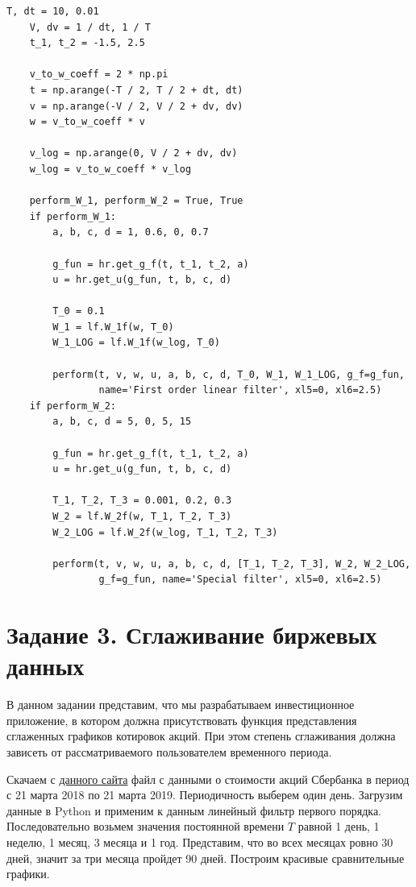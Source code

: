 \documentclass[a4paper, 12pt]{article}
\begin{document}
\begin{lstlisting}[label=l2, caption={Алгоритм, использующий приведенные ранее программы}]
    T, dt = 10, 0.01
    V, dv = 1 / dt, 1 / T
    t_1, t_2 = -1.5, 2.5

    v_to_w_coeff = 2 * np.pi
    t = np.arange(-T / 2, T / 2 + dt, dt)
    v = np.arange(-V / 2, V / 2 + dv, dv)
    w = v_to_w_coeff * v
    
    v_log = np.arange(0, V / 2 + dv, dv)
    w_log = v_to_w_coeff * v_log

    perform_W_1, perform_W_2 = True, True
    if perform_W_1:
        a, b, c, d = 1, 0.6, 0, 0.7

        g_fun = hr.get_g_f(t, t_1, t_2, a)
        u = hr.get_u(g_fun, t, b, c, d)

        T_0 = 0.1
        W_1 = lf.W_1f(w, T_0)
        W_1_LOG = lf.W_1f(w_log, T_0)

        perform(t, v, w, u, a, b, c, d, T_0, W_1, W_1_LOG, g_f=g_fun, 
                name='First order linear filter', xl5=0, xl6=2.5)
    if perform_W_2:
        a, b, c, d = 5, 0, 5, 15

        g_fun = hr.get_g_f(t, t_1, t_2, a)
        u = hr.get_u(g_fun, t, b, c, d)

        T_1, T_2, T_3 = 0.001, 0.2, 0.3
        W_2 = lf.W_2f(w, T_1, T_2, T_3)
        W_2_LOG = lf.W_2f(w_log, T_1, T_2, T_3)

        perform(t, v, w, u, a, b, c, d, [T_1, T_2, T_3], W_2, W_2_LOG,
                g_f=g_fun, name='Special filter', xl5=0, xl6=2.5)
    \end{lstlisting}

    
    \section{Задание 3. Сглаживание биржевых данных}
    В данном задании представим, что мы разрабатываем инвестиционное приложение, в котором должна
    присутствовать функция представления сглаженных графиков котировок акций. При этом степень
    сглаживания должна зависеть от рассматриваемого пользователем временного периода.


    Скачаем с \href{https://www.finam.ru/quote/moex/sber/export/}{данного сайта} файл с данными о
    стоимости акций Сбербанка в период с 21 марта 2018 по 21 марта 2019. Периодичность выберем один день.
    Загрузим данные в Python и применим к данным линейный фильтр первого порядка. Последовательно возьмем
    значения постоянной времени $T$ равной 1 день, 1 неделю, 1 месяц, 3 месяца и 1 год. Представим, что
    во всех месяцах ровно 30 дней, значит за три месяца пройдет 90 дней. Построим красивые сравнительные графики.
\end{document}
